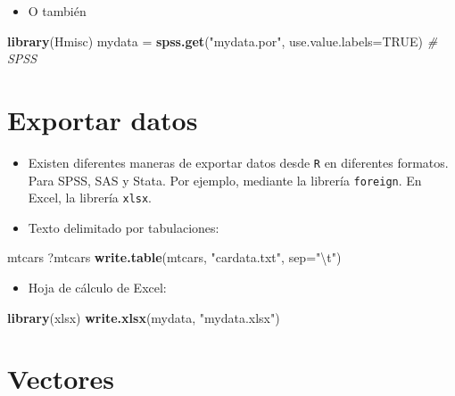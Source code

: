 \documentclass[]{book}
\newenvironment{Shaded}{\begin{snugshade}}{\end{snugshade}}
\newcommand{\KeywordTok}[1]{\textcolor[rgb]{0.13,0.29,0.53}{\textbf{#1}}}
\newcommand{\DataTypeTok}[1]{\textcolor[rgb]{0.13,0.29,0.53}{#1}}
\newcommand{\CharTok}[1]{\textcolor[rgb]{0.31,0.60,0.02}{#1}}
\newcommand{\StringTok}[1]{\textcolor[rgb]{0.31,0.60,0.02}{#1}}
\newcommand{\CommentTok}[1]{\textcolor[rgb]{0.56,0.35,0.01}{\textit{#1}}}
\newcommand{\OtherTok}[1]{\textcolor[rgb]{0.56,0.35,0.01}{#1}}
\newcommand{\NormalTok}[1]{#1}
\providecommand{\tightlist}{%
  \setlength{\itemsep}{0pt}\setlength{\parskip}{0pt}}
\begin{document}
\begin{itemize}
\tightlist
\item
  O también
\end{itemize}

\begin{Shaded}
\begin{Highlighting}[]
\KeywordTok{library}\NormalTok{(Hmisc)}
\NormalTok{mydata =}\StringTok{ }\KeywordTok{spss.get}\NormalTok{(}\StringTok{"mydata.por"}\NormalTok{, }\DataTypeTok{use.value.labels=}\OtherTok{TRUE}\NormalTok{)  }\CommentTok{# SPSS}
\end{Highlighting}
\end{Shaded}

\section{Exportar datos}\label{exportar-datos}

\begin{itemize}
\item
  Existen diferentes maneras de exportar datos desde \texttt{R} en
  diferentes formatos. Para SPSS, SAS y Stata. Por ejemplo, mediante la
  librería \texttt{foreign}. En Excel, la librería \texttt{xlsx}.
\item
  Texto delimitado por tabulaciones:
\end{itemize}

\begin{Shaded}
\begin{Highlighting}[]
\NormalTok{mtcars}
\NormalTok{?mtcars    }
\KeywordTok{write.table}\NormalTok{(mtcars, }\StringTok{"cardata.txt"}\NormalTok{, }\DataTypeTok{sep=}\StringTok{"}\CharTok{\textbackslash{}t}\StringTok{"}\NormalTok{) }
\end{Highlighting}
\end{Shaded}

\begin{itemize}
\tightlist
\item
  Hoja de cálculo de Excel:
\end{itemize}

\begin{Shaded}
\begin{Highlighting}[]
\KeywordTok{library}\NormalTok{(xlsx)}
\KeywordTok{write.xlsx}\NormalTok{(mydata, }\StringTok{"mydata.xlsx"}\NormalTok{)}
\end{Highlighting}
\end{Shaded}

\section{Vectores}\label{vectores}
\end{document}
